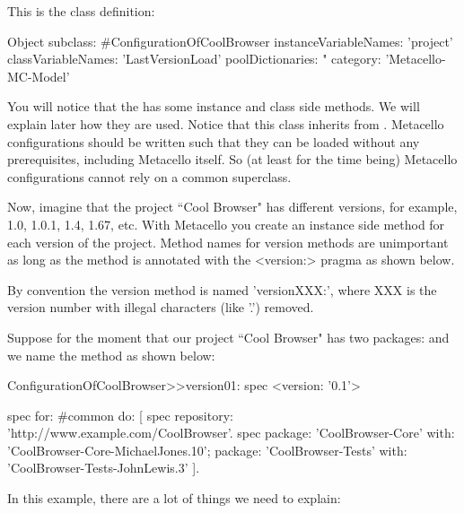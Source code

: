 \documentclass[a4paper,10pt,twoside]{book}
\begin{document}
This is the class definition:
\begin{code}{}
Object subclass: #ConfigurationOfCoolBrowser
	instanceVariableNames: 'project'
	classVariableNames: 'LastVersionLoad'
	poolDictionaries: "
	category: 'Metacello-MC-Model'
\end{code}

You will notice that the  has some instance and class side methods. We will explain later how they are used. Notice that this class inherits from .  Metacello configurations should be written such that they can be loaded without any prerequisites, including Metacello itself. So (at least for the time being) Metacello configurations cannot rely on a common superclass.

Now, imagine that the project ``Cool Browser" has different versions, for example, 1.0, 1.0.1, 1.4, 1.67, etc. 
With Metacello you create an instance side method for each version of the project. Method names for version methods are unimportant as long as the method is annotated with the <version:> pragma as shown below.

By convention the version method is named 'versionXXX:', where XXX is the version number with illegal characters (like '.') removed.

Suppose for the moment that our project ``Cool Browser" has two packages:  and  we name the method  as shown below:

\begin{code}{}
ConfigurationOfCoolBrowser>>version01: spec 
	<version: '0.1'>
	
	spec for: #common do: [
		spec repository: 'http://www.example.com/CoolBrowser'.
		spec 
			package: 'CoolBrowser-Core' with: 'CoolBrowser-Core-MichaelJones.10';
			package: 'CoolBrowser-Tests' with: 'CoolBrowser-Tests-JohnLewis.3' ].
\end{code}


In this example, there are a lot of things we need to explain:
\end{document}
